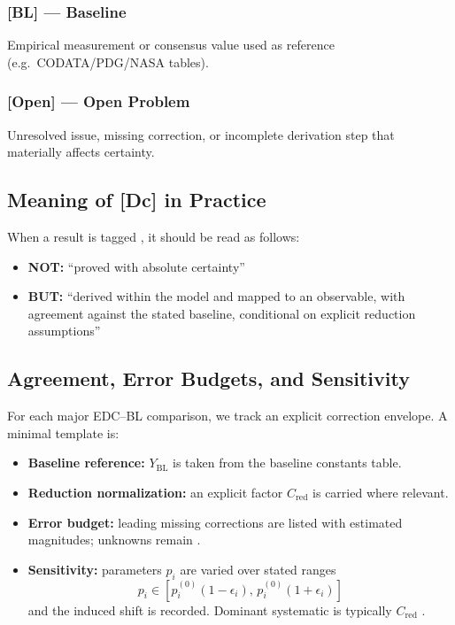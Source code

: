 \subsubsection*{[BL] --- Baseline}
Empirical measurement or consensus value used as reference (e.g.\ CODATA/PDG/NASA tables).

\subsubsection*{[Open] --- Open Problem}
Unresolved issue, missing correction, or incomplete derivation step that materially affects certainty.

\subsection*{Meaning of [Dc] in Practice}

When a result is tagged \tagDc{}, it should be read as follows:
\begin{itemize}
\item \textbf{NOT:} ``proved with absolute certainty''
\item \textbf{BUT:} ``derived within the model and mapped to an observable, with agreement
against the stated baseline, conditional on explicit reduction assumptions''
\end{itemize}

\subsection*{Agreement, Error Budgets, and Sensitivity}

For each major EDC--BL comparison, we track an explicit correction envelope.
A minimal template is:

\begin{itemize}
\item \textbf{Baseline reference:} $Y_{\mathrm{BL}}$ is taken from the baseline constants table.

\item \textbf{Reduction normalization:} an explicit factor $C_{\mathrm{red}}$ is carried where relevant.

\item \textbf{Error budget:} leading missing corrections are listed with estimated magnitudes; unknowns remain \tagOpen{}.

\item \textbf{Sensitivity:} parameters $p_i$ are varied over stated ranges
\[
p_i \in [p_i^{(0)}(1-\epsilon_i),\, p_i^{(0)}(1+\epsilon_i)]
\]
and the induced shift is recorded. Dominant systematic is typically $C_{\mathrm{red}}$ \tagOpen{}.
\end{itemize}

